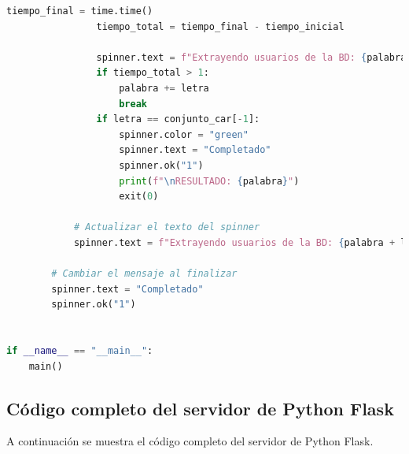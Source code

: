 \documentclass[a4paper,12pt]{article}
\begin{document}
\begin{lstlisting}[language=Python]
                tiempo_final = time.time()
                tiempo_total = tiempo_final - tiempo_inicial

                spinner.text = f"Extrayendo usuarios de la BD: {palabra + letra}"
                if tiempo_total > 1:
                    palabra += letra
                    break
                if letra == conjunto_car[-1]:
                    spinner.color = "green"
                    spinner.text = "Completado"
                    spinner.ok("1")
                    print(f"\nRESULTADO: {palabra}")
                    exit(0)

            # Actualizar el texto del spinner
            spinner.text = f"Extrayendo usuarios de la BD: {palabra + letra}"

        # Cambiar el mensaje al finalizar
        spinner.text = "Completado"
        spinner.ok("1")


if __name__ == "__main__":
    main()
\end{lstlisting}

\subsection{Código completo del servidor de Python Flask}

A continuación se muestra el código completo del servidor de Python Flask.
\end{document}
